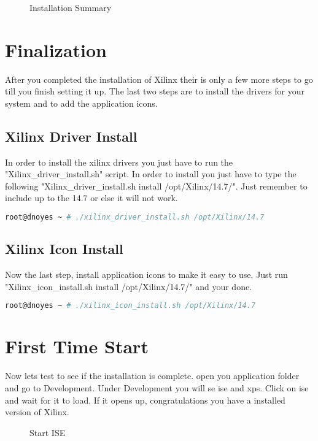 \documentclass[letter]{article}
\begin{document}
\begin{figure}[!htbp]
  \centering
  \caption{Installation Summary}
\end{figure}

\newpage
\section{Finalization}
After you completed the installation of Xilinx their is only a few more steps to go till you finish setting it up. The last two steps are to install the drivers for your system and to add the application icons.

\subsection{Xilinx Driver Install}
In order to install the xilinx drivers you just have to run the "Xilinx\_driver\_install.sh" script. In order to install you just have to type the following "Xilinx\_driver\_install.sh install /opt/Xilinx/14.7/". Just remember to include up to the 14.7 or else it will not work.

\begin{lstlisting}[language=bash,caption={Xilinx\_driver\_install.sh example}]
root@dnoyes ~ # ./xilinx_driver_install.sh /opt/Xilinx/14.7
\end{lstlisting}

\subsection{Xilinx Icon Install}
Now the last step, install application icons to make it easy to use. Just run "Xilinx\_icon\_install.sh install /opt/Xilinx/14.7/" and your done.

\begin{lstlisting}[language=bash,caption={Xilinx\_icon\_install.sh example}]
root@dnoyes ~ # ./xilinx_icon_install.sh /opt/Xilinx/14.7
\end{lstlisting}

\section{First Time Start}
Now lets test to see if the installation is complete. open you application folder and go to Development. Under Development you will se ise and xps. Click on ise and wait for it to load. If it opens up, congratulations you have a installed version of Xilinx.

\begin{figure}[!htbp]
  \centering
  \caption{Start ISE}
\end{figure}
\end{document}
